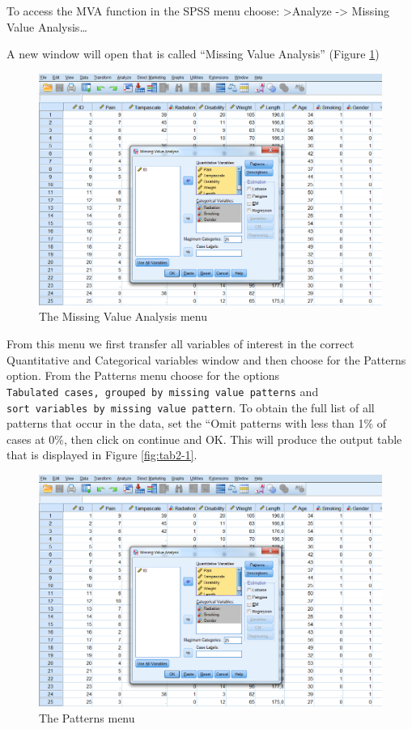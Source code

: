 \documentclass[]{book}
\theoremstyle{definition}
\theoremstyle{definition}
\theoremstyle{definition}
\theoremstyle{remark}
\begin{document}
To access the MVA function in the SPSS menu choose:
\textgreater{}Analyze -\textgreater{} Missing Value Analysis\ldots{}

A new window will open that is called ``Missing Value Analysis'' (Figure
\ref{fig:fig2-3})

\begin{figure}

{\centering \includegraphics[width=0.9\linewidth]{images/fig2.3} 

}

\caption{The Missing Value Analysis menu}\label{fig:fig2-3}
\end{figure}

From this menu we first transfer all variables of interest in the
correct Quantitative and Categorical variables window and then choose
for the Patterns option. From the Patterns menu choose for the options
\texttt{Tabulated\ cases,\ grouped\ by\ missing\ value\ patterns} and
\texttt{sort\ variables\ by\ missing\ value\ pattern}. To obtain the
full list of all patterns that occur in the data, set the ``Omit
patterns with less than 1\% of cases at 0\%, then click on continue and
OK. This will produce the output table that is displayed in Figure
\ref{fig:tab2-1}.

\begin{figure}

{\centering \includegraphics[width=0.9\linewidth]{images/fig2.3} 

}

\caption{The Patterns menu}\label{fig:fig2-4}
\end{figure}
\end{document}

